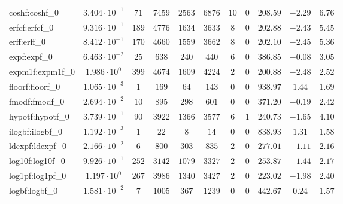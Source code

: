 \begin{tabular}{|l|c|c|c|c|c|c|c|c|c|c|}
coshf:coshf\_0               & $ 3.404 \cdot 10^{-1} $ & $ 71     $ & $ 7459   $ & $ 2563  $ & $ 6876   $ & $ 10  $ & $ 0 $ & $ 208.59      $ & $ -2.29   $ & $ 6.76    $ \\
erfcf:erfcf\_0               & $ 9.316 \cdot 10^{-1} $ & $ 189    $ & $ 4776   $ & $ 1634  $ & $ 3633   $ & $ 8   $ & $ 0 $ & $ 202.88      $ & $ -2.43   $ & $ 5.45    $ \\
erff:erff\_0                 & $ 8.412 \cdot 10^{-1} $ & $ 170    $ & $ 4660   $ & $ 1559  $ & $ 3662   $ & $ 8   $ & $ 0 $ & $ 202.10      $ & $ -2.45   $ & $ 5.36    $ \\
expf:expf\_0                 & $ 6.463 \cdot 10^{-2} $ & $ 25     $ & $ 638    $ & $ 240   $ & $ 440    $ & $ 6   $ & $ 0 $ & $ 386.85      $ & $ -0.08   $ & $ 3.05    $ \\
expm1f:expm1f\_0             & $ 1.986 \cdot 10^{0}  $ & $ 399    $ & $ 4674   $ & $ 1609  $ & $ 4224   $ & $ 2   $ & $ 0 $ & $ 200.88      $ & $ -2.48   $ & $ 2.52    $ \\
floorf:floorf\_0             & $ 1.065 \cdot 10^{-3} $ & $ 1      $ & $ 169    $ & $ 64    $ & $ 143    $ & $ 0   $ & $ 0 $ & $ 938.97      $ & $ 1.44    $ & $ 1.69    $ \\
fmodf:fmodf\_0               & $ 2.694 \cdot 10^{-2} $ & $ 10     $ & $ 895    $ & $ 298   $ & $ 601    $ & $ 0   $ & $ 0 $ & $ 371.20      $ & $ -0.19   $ & $ 2.42    $ \\
hypotf:hypotf\_0             & $ 3.739 \cdot 10^{-1} $ & $ 90     $ & $ 3922   $ & $ 1366  $ & $ 3577   $ & $ 6   $ & $ 1 $ & $ 240.73      $ & $ -1.65   $ & $ 4.10    $ \\
ilogbf:ilogbf\_0             & $ 1.192 \cdot 10^{-3} $ & $ 1      $ & $ 22     $ & $ 8     $ & $ 14     $ & $ 0   $ & $ 0 $ & $ 838.93      $ & $ 1.31    $ & $ 1.58    $ \\
ldexpf:ldexpf\_0             & $ 2.166 \cdot 10^{-2} $ & $ 6      $ & $ 800    $ & $ 303   $ & $ 835    $ & $ 2   $ & $ 0 $ & $ 277.01      $ & $ -1.11   $ & $ 2.16    $ \\
log10f:log10f\_0             & $ 9.926 \cdot 10^{-1} $ & $ 252    $ & $ 3142   $ & $ 1079  $ & $ 3327   $ & $ 2   $ & $ 0 $ & $ 253.87      $ & $ -1.44   $ & $ 2.17    $ \\
log1pf:log1pf\_0             & $ 1.197 \cdot 10^{0}  $ & $ 267    $ & $ 3986   $ & $ 1340  $ & $ 3427   $ & $ 2   $ & $ 0 $ & $ 223.02      $ & $ -1.98   $ & $ 2.40    $ \\
logbf:logbf\_0               & $ 1.581 \cdot 10^{-2} $ & $ 7      $ & $ 1005   $ & $ 367   $ & $ 1239   $ & $ 0   $ & $ 0 $ & $ 442.67      $ & $ 0.24    $ & $ 1.57    $ \\

\end{tabular}
